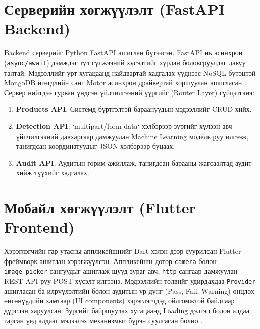 \section{Серверийн хөгжүүлэлт (FastAPI Backend)}
Backend серверийг Python FastAPI ашиглан бүтээсэн. FastAPI нь асинхрон (\texttt{async/await}) дэмждэг тул сүлжээний хүсэлтийг хурдан боловсруулдаг давуу талтай. Мэдээллийг урт хугацаанд найдвартай хадгалах үүднээс NoSQL бүтэцтэй MongoDB өгөгдлийн санг Motor асинхрон драйвертай хоршуулан ашигласан \cite{fastapi}. Сервер нийтдээ гурван үндсэн үйлчилгээний үүргийг (Router Layer) гүйцэтгэнэ:
\begin{enumerate}
    \item \textbf{Products API}: Системд бүртгэлтэй бараануудын мэдээллийг CRUD хийх.
    \item \textbf{Detection API}: `multipart/form-data` хэлбэрээр зургийг хүлээн авч үйлчилгээний давхаргаар дамжуулан Machine Learning модель руу илгээж, танигдсан координатуудыг JSON хэлбэрээр буцаах.
    \item \textbf{Audit API}: Аудитын горим ажиллаж, танигдсан барааны жагсаалтад аудит хийж түүхийг хадгалах.
\end{enumerate}

\section{Мобайл хөгжүүлэлт (Flutter Frontend)}
Хэрэглэгчийн гар утасны аппликейшнийг Dart хэлэн дээр суурилсан Flutter фреймворк ашиглан хэрэгжүүлсэн. Аппликейшн дотор \texttt{camera} болон \texttt{image\_picker} сангуудыг ашиглаж шууд зураг авч, \texttt{http} сангаар дамжуулан REST API руу POST хүсэлт илгээнэ. Мэдээллийн төлвийг удирдахдаа \texttt{Provider} ашигласан ба илрүүлэлтийн болон аудитын үр дүнг (Pass, Fail, Warning) онцлох өнгөнүүдийн хамтаар (UI components) хэрэглэгчдэд ойлгомжтой байдлаар дүрслэн харуулсан. Зургийг байршуулах хугацаанд Loading дэлгэц болон алдаа гарсан үед алдааг мэдээлэх механизмыг бүрэн суулгасан болно \cite{flutter}.
